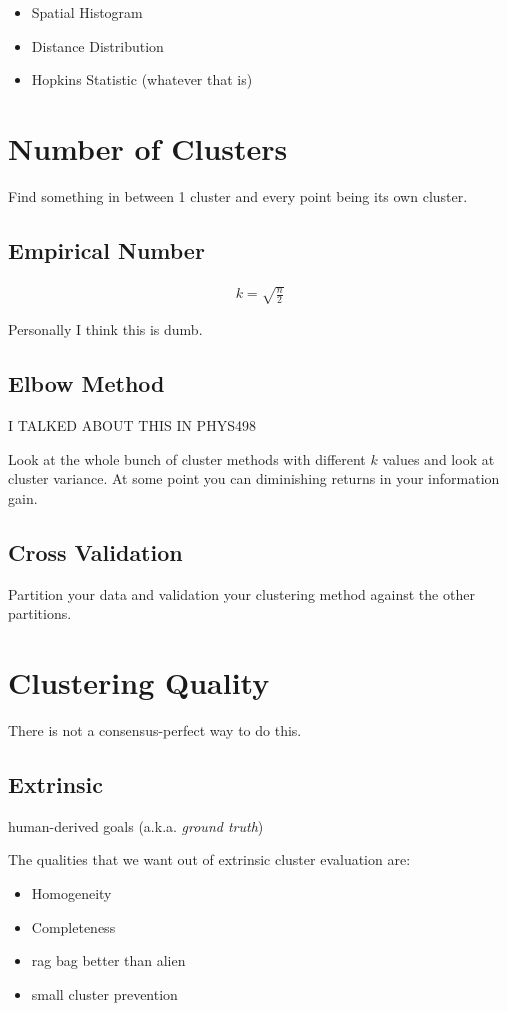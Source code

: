 \documentclass[fleqn]{report}
\newcommand{\equations} [1] {
\begin{gather*}
#1
\end{gather*}
}
\begin{document}
\begin{itemize}
    \item 
    Spatial Histogram 
    \item 
    Distance Distribution 
    \item 
    Hopkins Statistic (whatever that is)
\end{itemize}

\section{Number of Clusters}
Find something in between 1 cluster and every point being its 
own cluster.

\subsection{Empirical Number}
\equations{
    k = \sqrt{\frac{n}{2}}
}
Personally I think this is dumb.

\subsection{Elbow Method}
I TALKED ABOUT THIS IN PHYS498

Look at the whole bunch of cluster methods with different 
$k$ values and look at cluster variance. At some point 
you can diminishing returns in your information gain.

\subsection{Cross Validation}
Partition your data and validation your clustering method 
against the other partitions.

\section{Clustering Quality}
There is not a consensus-perfect way to do this. 

\subsection{Extrinsic} 
human-derived goals (a.k.a. \textit{ground truth})

The qualities that we want out of extrinsic cluster 
evaluation are:
\begin{itemize}
    \item 
    Homogeneity 
    \item 
    Completeness 
    \item 
    rag bag better than alien 
    \item 
    small cluster prevention
\end{itemize}
\end{document}
